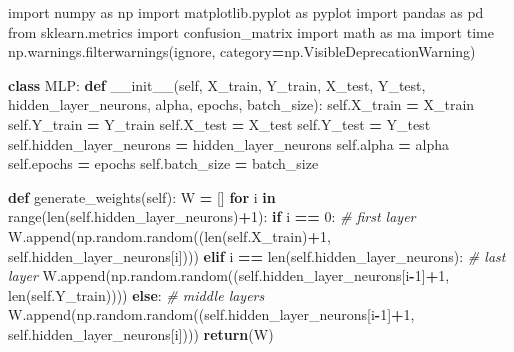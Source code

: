 \documentclass[
]{book}
\newenvironment{Shaded}{\begin{snugshade}}{\end{snugshade}}
\newcommand{\BuiltInTok}[1]{#1}
\newcommand{\CommentTok}[1]{\textcolor[rgb]{0.56,0.35,0.01}{\textit{#1}}}
\newcommand{\ControlFlowTok}[1]{\textcolor[rgb]{0.13,0.29,0.53}{\textbf{#1}}}
\newcommand{\DecValTok}[1]{\textcolor[rgb]{0.00,0.00,0.81}{#1}}
\newcommand{\FunctionTok}[1]{\textcolor[rgb]{0.00,0.00,0.00}{#1}}
\newcommand{\ImportTok}[1]{#1}
\newcommand{\KeywordTok}[1]{\textcolor[rgb]{0.13,0.29,0.53}{\textbf{#1}}}
\newcommand{\NormalTok}[1]{#1}
\newcommand{\OperatorTok}[1]{\textcolor[rgb]{0.81,0.36,0.00}{\textbf{#1}}}
\newcommand{\StringTok}[1]{\textcolor[rgb]{0.31,0.60,0.02}{#1}}
\newcommand{\VariableTok}[1]{\textcolor[rgb]{0.00,0.00,0.00}{#1}}
\begin{document}
\begin{Shaded}
\begin{Highlighting}[]
\ImportTok{import}\NormalTok{ numpy }\ImportTok{as}\NormalTok{ np}
\ImportTok{import}\NormalTok{ matplotlib.pyplot }\ImportTok{as}\NormalTok{ pyplot}
\ImportTok{import}\NormalTok{ pandas }\ImportTok{as}\NormalTok{ pd}
\ImportTok{from}\NormalTok{ sklearn.metrics }\ImportTok{import}\NormalTok{ confusion\_matrix}
\ImportTok{import}\NormalTok{ math }\ImportTok{as}\NormalTok{ ma}
\ImportTok{import}\NormalTok{ time}
\NormalTok{np.warnings.filterwarnings(}\StringTok{\textquotesingle{}ignore\textquotesingle{}}\NormalTok{, category}\OperatorTok{=}\NormalTok{np.VisibleDeprecationWarning) }

\KeywordTok{class}\NormalTok{ MLP:}
  \KeywordTok{def} \FunctionTok{\_\_init\_\_}\NormalTok{(}\VariableTok{self}\NormalTok{, X\_train, Y\_train, X\_test, Y\_test, hidden\_layer\_neurons, alpha, epochs, batch\_size):}
    \VariableTok{self}\NormalTok{.X\_train }\OperatorTok{=}\NormalTok{ X\_train}
    \VariableTok{self}\NormalTok{.Y\_train }\OperatorTok{=}\NormalTok{ Y\_train}
    \VariableTok{self}\NormalTok{.X\_test }\OperatorTok{=}\NormalTok{ X\_test}
    \VariableTok{self}\NormalTok{.Y\_test }\OperatorTok{=}\NormalTok{ Y\_test}
    \VariableTok{self}\NormalTok{.hidden\_layer\_neurons }\OperatorTok{=}\NormalTok{ hidden\_layer\_neurons}
    \VariableTok{self}\NormalTok{.alpha }\OperatorTok{=}\NormalTok{ alpha}
    \VariableTok{self}\NormalTok{.epochs }\OperatorTok{=}\NormalTok{ epochs}
    \VariableTok{self}\NormalTok{.batch\_size }\OperatorTok{=}\NormalTok{ batch\_size}
   
  \KeywordTok{def}\NormalTok{ generate\_weights(}\VariableTok{self}\NormalTok{):}
\NormalTok{    W }\OperatorTok{=}\NormalTok{ []}
    \ControlFlowTok{for}\NormalTok{ i }\KeywordTok{in} \BuiltInTok{range}\NormalTok{(}\BuiltInTok{len}\NormalTok{(}\VariableTok{self}\NormalTok{.hidden\_layer\_neurons)}\OperatorTok{+}\DecValTok{1}\NormalTok{):}
      \ControlFlowTok{if}\NormalTok{ i }\OperatorTok{==} \DecValTok{0}\NormalTok{: }\CommentTok{\# first layer}
\NormalTok{        W.append(np.random.random((}\BuiltInTok{len}\NormalTok{(}\VariableTok{self}\NormalTok{.X\_train)}\OperatorTok{+}\DecValTok{1}\NormalTok{, }\VariableTok{self}\NormalTok{.hidden\_layer\_neurons[i])))}
      \ControlFlowTok{elif}\NormalTok{ i }\OperatorTok{==} \BuiltInTok{len}\NormalTok{(}\VariableTok{self}\NormalTok{.hidden\_layer\_neurons): }\CommentTok{\# last layer}
\NormalTok{        W.append(np.random.random((}\VariableTok{self}\NormalTok{.hidden\_layer\_neurons[i}\OperatorTok{{-}}\DecValTok{1}\NormalTok{]}\OperatorTok{+}\DecValTok{1}\NormalTok{, }\BuiltInTok{len}\NormalTok{(}\VariableTok{self}\NormalTok{.Y\_train))))}
      \ControlFlowTok{else}\NormalTok{: }\CommentTok{\# middle layers}
\NormalTok{        W.append(np.random.random((}\VariableTok{self}\NormalTok{.hidden\_layer\_neurons[i}\OperatorTok{{-}}\DecValTok{1}\NormalTok{]}\OperatorTok{+}\DecValTok{1}\NormalTok{, }\VariableTok{self}\NormalTok{.hidden\_layer\_neurons[i])))}
    \ControlFlowTok{return}\NormalTok{(W)}
    

\end{Highlighting}
\end{Shaded}
\end{document}
